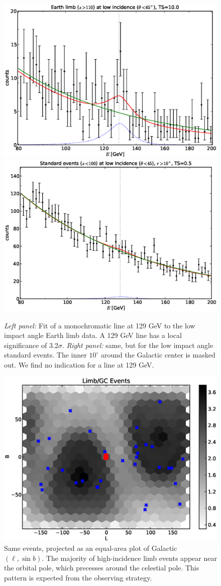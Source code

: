 \documentclass[aps,twocolumn,prd,superscriptaddress,showpacs,nofootinbib,fixfloat]{revtex4}
\begin{document}
\begin{figure}[p]
  \centering
  \includegraphics[width=0.48\linewidth]{plots/albedo_line_thetaCut.eps}
  \includegraphics[width=0.48\linewidth]{plots/noalbedo_line_thetaCut.eps}
  \caption{\emph{Left panel:} Fit of a monochromatic line at 129 GeV to the
  low impact angle Earth limb data. A 129 GeV line has a local significance of
  3.2$\sigma$.  \emph{Right panel:} same, but for the low impact angle
  standard events. The inner $10^\circ$ around the Galactic center is masked
  out. We find no indication for a line at 129 GeV.}
  \label{fig:albedoline}
\end{figure}

\begin{figure}[p]
  \centering
  \includegraphics[width=1.0\linewidth]{plots/limb_l_b.eps}
  \caption{Same events, projected as an equal-area plot of Galactic $(\ell,
  \sin b)$.  The majority of high-incidence limb events appear near the
  orbital pole, which precesses around the celestial pole.  This pattern is
  expected from the observing strategy.}
  \label{fig:l-b}
\end{figure}
\end{document}
